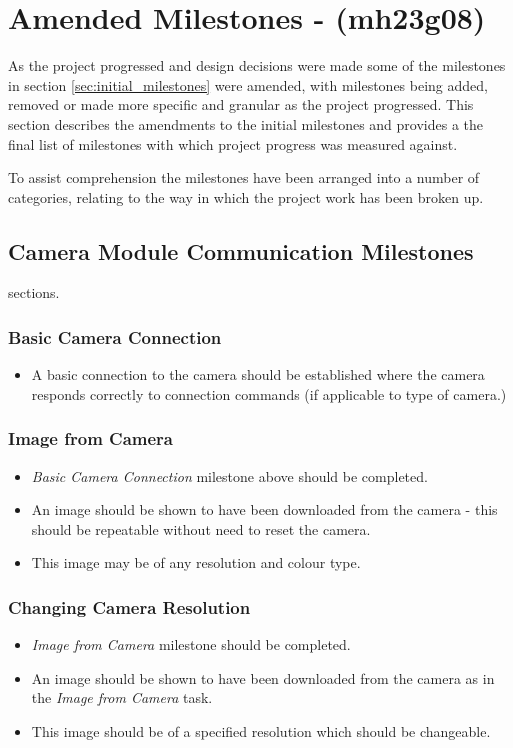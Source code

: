 
\section{Amended Milestones - (mh23g08)}
\label{sec:amended_milestones}
As the project progressed and design decisions were made some of the milestones in section
\ref{sec:initial_milestones} were amended, with milestones being added, removed or made more
specific and granular as the project progressed. This section describes the amendments to the
initial milestones and provides a the final list of milestones with which project progress was measured
against.

To assist comprehension the milestones have been arranged into a number of categories,
relating to the way in which the project work has been broken up. 

\subsection{Camera Module Communication Milestones}
sections. 
	\subsubsection{Basic Camera Connection}
		\begin{itemize}
			\item 	A basic connection to the camera should be established
				where the camera responds correctly to connection 
				commands (if applicable to type of camera.)
		\end{itemize}

	\subsubsection{Image from Camera}
		\begin{itemize}
			\item 	\emph{Basic Camera Connection} milestone above should
				be completed.
			\item 	An image should be shown to have been downloaded 
				from the camera - this should be repeatable without
				need to reset the camera.
			\item 	This image may be of any resolution and colour type.
		\end{itemize} 

	\subsubsection{Changing Camera Resolution}
		\begin{itemize}
			\item \emph{Image from Camera} milestone should be completed.
			\item 	An image should be shown to have been downloaded 
				from the camera as in the \emph{Image from Camera}
				task.
			\item 	This image should be of a specified resolution which
				should be changeable.
		\end{itemize}

